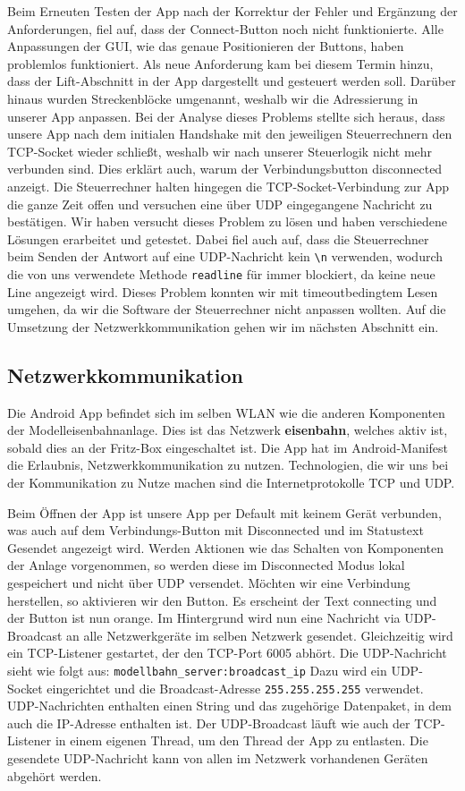 \documentclass{article}
\begin{document}
Beim Erneuten Testen der App nach der Korrektur der Fehler und Ergänzung der Anforderungen, fiel auf, dass der Connect-Button noch nicht funktionierte.
Alle Anpassungen der GUI, wie das genaue Positionieren der Buttons, haben problemlos funktioniert.
Als neue Anforderung kam bei diesem Termin hinzu, dass der Lift-Abschnitt in der App dargestellt und gesteuert werden soll.
Darüber hinaus wurden Streckenblöcke umgenannt, weshalb wir die Adressierung in unserer App anpassen.
Bei der Analyse dieses Problems stellte sich heraus, dass unsere App nach dem initialen Handshake mit den jeweiligen Steuerrechnern den TCP-Socket wieder schließt, weshalb wir nach unserer Steuerlogik nicht mehr verbunden sind.
Dies erklärt auch, warum der Verbindungsbutton disconnected anzeigt.
Die Steuerrechner halten hingegen die TCP-Socket-Verbindung zur App die ganze Zeit offen und versuchen eine über UDP eingegangene Nachricht zu bestätigen.
Wir haben versucht dieses Problem zu lösen und haben verschiedene Lösungen erarbeitet und getestet.
Dabei fiel auch auf, dass die Steuerrechner beim Senden der Antwort auf eine UDP-Nachricht kein \texttt{\textbackslash n} verwenden, wodurch die von uns verwendete Methode \texttt{readline} für immer blockiert, da keine neue Line angezeigt wird.
Dieses Problem konnten wir mit timeoutbedingtem Lesen umgehen, da wir die Software der Steuerrechner nicht anpassen wollten.
Auf die Umsetzung der Netzwerkkommunikation gehen wir im nächsten Abschnitt ein.

\subsection{Netzwerkkommunikation}
Die Android App befindet sich im selben WLAN wie die anderen Komponenten der Modelleisenbahnanlage.
Dies ist das Netzwerk \textbf{eisenbahn}, welches aktiv ist, sobald dies an der Fritz-Box eingeschaltet ist.
Die App hat im Android-Manifest die Erlaubnis, Netzwerkkommunikation zu nutzen.
Technologien, die wir uns bei der Kommunikation zu Nutze machen sind die Internetprotokolle TCP und UDP.

Beim Öffnen der App ist unsere App per Default mit keinem Gerät verbunden, was auch auf dem Verbindungs-Button mit Disconnected und im Statustext Gesendet angezeigt wird.
Werden Aktionen wie das Schalten von Komponenten der Anlage vorgenommen, so werden diese im Disconnected Modus lokal gespeichert und nicht über UDP versendet.
Möchten wir eine Verbindung herstellen, so aktivieren wir den Button.
Es erscheint der Text connecting und der Button ist nun orange.
Im Hintergrund wird nun eine Nachricht via UDP-Broadcast an alle Netzwerkgeräte im selben Netzwerk gesendet.
Gleichzeitig wird ein TCP-Listener gestartet, der den TCP-Port 6005 abhört.
Die UDP-Nachricht sieht wie folgt aus:
\texttt{modellbahn\_server:broadcast\_ip}
Dazu wird ein UDP-Socket eingerichtet und die Broadcast-Adresse \texttt{255.255.255.255} verwendet.
UDP-Nachrichten enthalten einen String und das zugehörige Datenpaket, in dem auch die IP-Adresse enthalten ist.
Der UDP-Broadcast läuft wie auch der TCP-Listener in einem eigenen Thread, um den Thread der App zu entlasten.
Die gesendete UDP-Nachricht kann von allen im Netzwerk vorhandenen Geräten abgehört werden.
\end{document}
